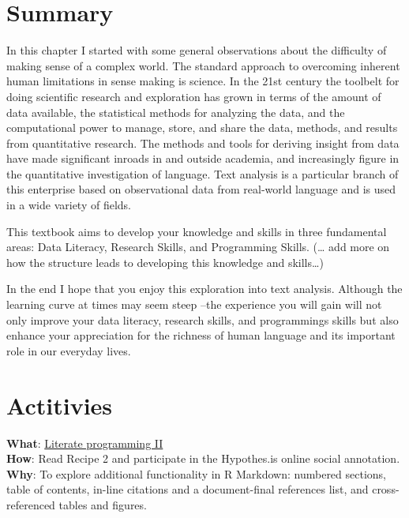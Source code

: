 \documentclass[
  letterpaper,
]{latex/krantz}
\begin{document}
\hypertarget{summary-1}{%
\section*{Summary}\label{summary-1}}

In this chapter I started with some general observations about the
difficulty of making sense of a complex world. The standard approach to
overcoming inherent human limitations in sense making is science. In the
21st century the toolbelt for doing scientific research and exploration
has grown in terms of the amount of data available, the statistical
methods for analyzing the data, and the computational power to manage,
store, and share the data, methods, and results from quantitative
research. The methods and tools for deriving insight from data have made
significant inroads in and outside academia, and increasingly figure in
the quantitative investigation of language. Text analysis is a
particular branch of this enterprise based on observational data from
real-world language and is used in a wide variety of fields.

This textbook aims to develop your knowledge and skills in three
fundamental areas: Data Literacy, Research Skills, and Programming
Skills. (\ldots{} add more on how the structure leads to developing this
knowledge and skills\ldots)

In the end I hope that you enjoy this exploration into text analysis.
Although the learning curve at times may seem steep --the experience you
will gain will not only improve your data literacy, research skills, and
programmings skills but also enhance your appreciation for the richness
of human language and its important role in our everyday lives.

\hypertarget{actitivies}{%
\section*{Actitivies}\label{actitivies}}

\begin{tcolorbox}[enhanced jigsaw, opacitybacktitle=0.6, breakable, colframe=quarto-callout-tip-color-frame, arc=.35mm, left=2mm, leftrule=.75mm, title=\textcolor{quarto-callout-tip-color}{\faLightbulb}\hspace{0.5em}{Recipe}, opacityback=0, colback=white, toptitle=1mm, rightrule=.15mm, titlerule=0mm, bottomtitle=1mm, bottomrule=.15mm, coltitle=black, colbacktitle=quarto-callout-tip-color!10!white, toprule=.15mm]
\textbf{What}:
\href{https://lin380.github.io/tadr/articles/recipe_2.html}{Literate
programming II}\\
\textbf{How}: Read Recipe 2 and participate in the Hypothes.is online
social annotation.\\
\textbf{Why}: To explore additional functionality in R Markdown:
numbered sections, table of contents, in-line citations and a
document-final references list, and cross-referenced tables and figures.
\end{tcolorbox}
\end{document}
